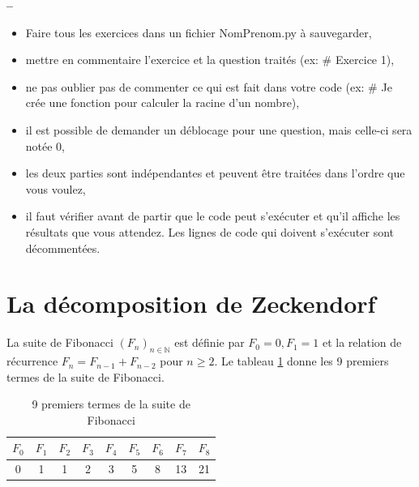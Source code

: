 

\begin{center}
{\Large\bf {\type} \no {\numero} -- \descrip}
\end{center}


\hspace{-1cm}
\begin{boxedminipage}{\textwidth} 
\begin{itemize}
 \item Faire tous les exercices dans un fichier {NomPrenom.py} à sauvegarder,
 \item mettre en commentaire l'exercice et la question traités (ex: \# Exercice 1),
 \item ne pas oublier pas de commenter ce qui est fait dans votre code (ex: \# Je crée une fonction pour calculer la racine d'un nombre),
 \item il est possible de demander un déblocage pour une question, mais celle-ci sera notée 0,
 \item les deux parties sont indépendantes et peuvent être traitées dans l'ordre que vous voulez,
 \item il faut vérifier avant de partir que le code peut s'exécuter et qu'il affiche les résultats que vous attendez. Les lignes de code qui doivent s'exécuter sont décommentées.
\end{itemize}
\end{boxedminipage}

\section{La décomposition de Zeckendorf}

La suite de Fibonacci $(F_{n})_{n\in \mathbb {N} }$ est définie par $F_{0}=0, F_{1}=1$ et la relation de récurrence $F_{n}=F_{n-1}+F_{n-2}$ pour $n\geq 2$. Le tableau \ref{tab01} donne les 9 premiers termes de la suite de Fibonacci.

\begin{table}[ht!]
\begin{center}
\begin{tabular}{|c|c|c|c|c|c|c|c|c|}
\hline
$F_0$ & $F_1$ & $F_2$ & $F_3$ & $F_4$ & $F_5$ & $F_6$ & $F_7$ & $F_8$\\
\hline
0&1&1&2&3&5&8&13&21 \\
\hline
\end{tabular}
\end{center}
\caption{\label{tab01} 9 premiers termes de la suite de Fibonacci}
\end{table}

